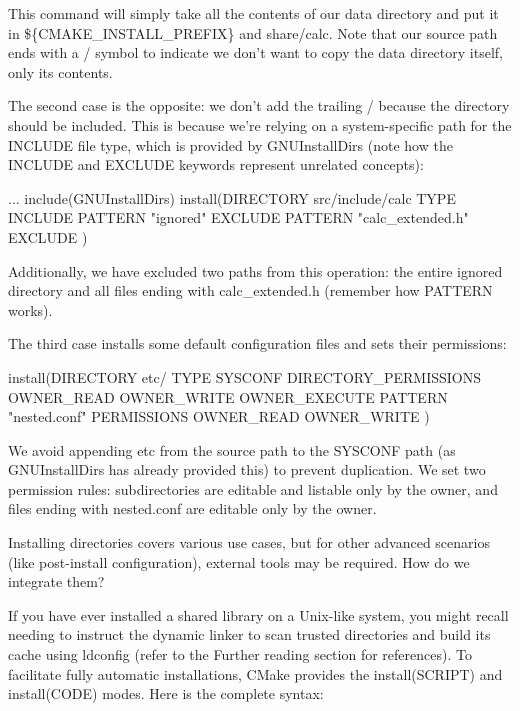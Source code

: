 This command will simply take all the contents of our data directory and put it in \$\{CMAKE\_INSTALL\_PREFIX\} and share/calc. Note that our source path ends with a / symbol to indicate we don’t want to copy the data directory itself, only its contents.

The second case is the opposite: we don’t add the trailing / because the directory should be included. This is because we’re relying on a system-specific path for the INCLUDE file type, which is provided by GNUInstallDirs (note how the INCLUDE and EXCLUDE keywords represent unrelated concepts):


\begin{cmake}
...
include(GNUInstallDirs)
install(DIRECTORY src/include/calc TYPE INCLUDE
    PATTERN "ignored" EXCLUDE
    PATTERN "calc_extended.h" EXCLUDE
)
\end{cmake}

Additionally, we have excluded two paths from this operation: the entire ignored directory and all files ending with calc\_extended.h (remember how PATTERN works).

The third case installs some default configuration files and sets their permissions:


\begin{cmake}
install(DIRECTORY etc/ TYPE SYSCONF
    DIRECTORY_PERMISSIONS
        OWNER_READ OWNER_WRITE OWNER_EXECUTE
    PATTERN "nested.conf"
        PERMISSIONS OWNER_READ OWNER_WRITE
)
\end{cmake}

We avoid appending etc from the source path to the SYSCONF path (as GNUInstallDirs has already provided this) to prevent duplication. We set two permission rules: subdirectories are editable and listable only by the owner, and files ending with nested.conf are editable only by the owner.

Installing directories covers various use cases, but for other advanced scenarios (like post-install configuration), external tools may be required. How do we integrate them?


If you have ever installed a shared library on a Unix-like system, you might recall needing to instruct the dynamic linker to scan trusted directories and build its cache using ldconfig (refer to the Further reading section for references). To facilitate fully automatic installations, CMake provides the install(SCRIPT) and install(CODE) modes. Here is the complete syntax:

